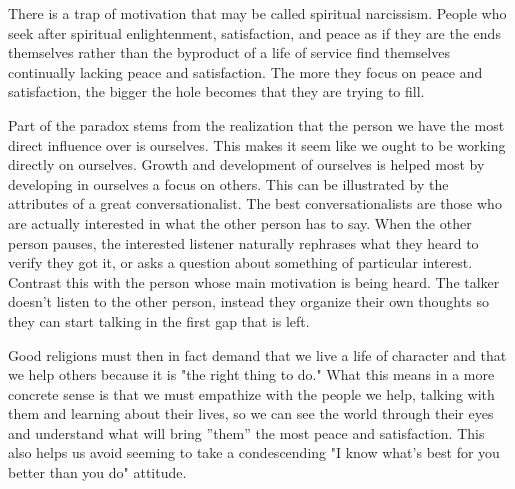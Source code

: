 \documentclass[ebook,11pt,openany,twoside,showtrims]{memoir}
\begin{document}
There is a trap of motivation that may be called spiritual narcissism. People
who seek after spiritual enlightenment, satisfaction, and peace as if they are
the ends themselves rather than the byproduct of a life of service find
themselves continually lacking peace and satisfaction. The more they focus on
peace and satisfaction, the bigger the hole becomes that they are trying to
fill.

Part of the paradox stems from the realization that the person we have the most
direct influence over is ourselves. This makes it seem like we ought to be
working directly on ourselves. Growth and development of ourselves is helped
most by developing in ourselves a focus on others. This can be illustrated by
the attributes of a great conversationalist. The best conversationalists are
those who are actually interested in what the other person has to say. When the
other person pauses, the interested listener naturally rephrases what they
heard to verify they got it, or asks a question about something of particular
interest. Contrast this with the person whose main motivation is being heard.
The talker doesn't listen to the other person, instead they organize their own
thoughts so they can start talking in the first gap that is left.

Good religions must then in fact demand that we live a life of character and
that we help others because it is "the right thing to do." What this means in a
more concrete sense is that we must empathize with the people we help, talking
with them and learning about their lives, so we can see the world through their
eyes and understand what will bring ''them'' the most peace and satisfaction.
This also helps us avoid seeming to take a condescending "I know what's best
for you better than you do" attitude.

\newpage
\tableofcontents
\end{document}
